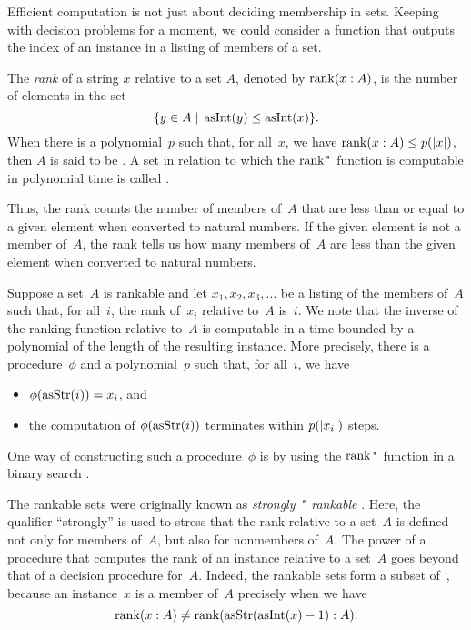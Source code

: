 Efficient computation is not just about deciding membership in sets.
Keeping with decision problems for a moment, we could consider a function that outputs the index of an instance in a listing of members of a set.
\begin{definition}
  The \emph{rank} of a string $x$ relative to a set $A$, denoted by $\operatorname{rank}(x : A)$, is the number of elements in the set
  \begin{equation*}
    \{y \in A \;|\; \operatorname{asInt}(y) \le \operatorname{asInt}(x)\}.
  \end{equation*}
  When there is a polynomial~$p$ such that, for all~$x$, we have $\operatorname{rank}(x : A) \le p({\lvert x\rvert})$, then $A$ is said to be .
  A set in relation to which the $\operatorname{rank}$"~function is computable in polynomial time is called .
\end{definition}

Thus, the rank counts the number of members of~$A$ that are less than or equal to a given element when converted to natural numbers.
If the given element is not a member of~$A$, the rank tells us how many members of~$A$ are less than the given element when converted to natural numbers.

Suppose a set~$A$ is \pdash{}rankable and let $x_1, x_2, x_3, \ldots$ be a listing of the members of~$A$ such that, for all~$i$, the rank of~$x_i$ relative to~$A$ is~$i$.
We note that the inverse of the ranking function relative to~$A$ is computable in a time bounded by a polynomial of the length of the resulting instance.
More precisely, there is a procedure~$\phi$ and a polynomial~$p$ such that, for all~$i$, we have
\begin{itemize}
\item $\phi(\operatorname{asStr}(i)) = x_i$, and
\item the computation of $\phi(\operatorname{asStr}(i))$ terminates within $p({\lvert x_i\rvert})$ steps.
\end{itemize}
One way of constructing such a procedure~$\phi$ is by using the $\operatorname{rank}$"~function in a binary search \parencite[Theorem~6.1]{hemachandra1990complexity}.

The \pdash{}rankable sets were originally known as \emph{strongly "~rankable} \parencite{hemachandra1990complexity,goldberg1991compression}.
Here, the qualifier \enquote{strongly} is used to stress that the rank relative to a set~$A$ is defined not only for members of~$A$, but also for nonmembers of~$A$.
The power of a procedure that computes the rank of an instance relative to a set~$A$ goes beyond that of a decision procedure for~$A$.
Indeed, the \pdash{}rankable sets form a subset of~, because an instance~$x$ is a member of~$A$ precisely when we have
\begin{equation*}
  \operatorname{rank}(x : A) \ne \operatorname{rank}(\operatorname{asStr}(\operatorname{asInt}(x) - 1) : A).
\end{equation*}

